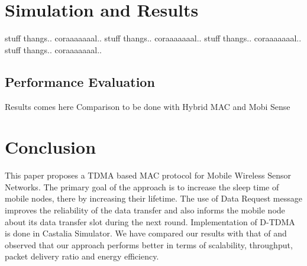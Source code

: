 \documentclass[a4paper, conference, 10pt]{IEEEtran}
\begin{document}

\section{Simulation and Results}
\label{sim}
stuff thangs.. coraaaaaaal.. stuff thangs.. coraaaaaaal..
stuff thangs.. coraaaaaaal..  stuff thangs.. coraaaaaaal..

\subsection{Performance Evaluation}         

Results comes here
Comparison to be done with Hybrid MAC and Mobi Sense

\section{Conclusion}
\label{conclusion}
This paper proposes a TDMA based MAC protocol for Mobile Wireless Sensor Networks. The primary goal of the approach is to increase the sleep time of mobile nodes, there by increasing their lifetime. The use of Data Request message improves the reliability of the data transfer and also informs the mobile node about its data transfer slot during the next round. Implementation of D-TDMA is done in Castalia Simulator. We have compared our results with that of \cite{hmac} and observed that our approach performs better in terms of scalability, throughput, packet delivery ratio and energy efficiency.



\end{document}
